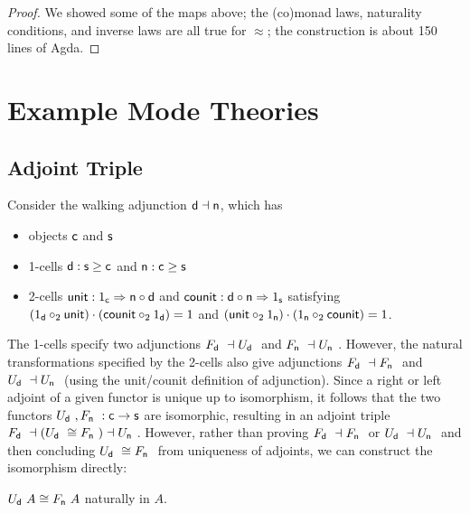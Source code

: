 \documentclass{drl-common/llncs}
\newcommand{\la}{\ensuremath{\dashv}}
\newcommand{\tc}[2]{\ensuremath{#1 \Rightarrow #2}}
\newcommand\compo[2]{\ensuremath{#1 \circ #2}}
\newcommand\compv[2]{\ensuremath{#1 \cdot #2}}
\newcommand\comph[2]{\ensuremath{#1 \mathbin{\circ_2} #2}}
\newcommand\F[2]{\ensuremath{F_{#1} \,\, #2}}
\newcommand\U[2]{\ensuremath{U_{#1} \,\, #2}}
\newcommand\ap[2]{\ensuremath{#1 \approx #2}}
\newcommand\iso{\cong}
\begin{document}
\begin{proof}
We showed some of the maps above; the (co)monad laws, naturality
conditions, and inverse laws are all true for \ap{}{}; the construction
is about 150 lines of Agda.
\end{proof}

\section{Example Mode Theories}
\label{sec:triple}

\subsection{Adjoint Triple}

Consider the walking adjunction $\dsd d \la \dsd n$, which has

\begin{itemize}
\item objects $\mathsf{c}$ and $\mathsf{s}$
\item 1-cells $\mathsf{d} : \mathsf{s} \ge \mathsf{c}$ and $\mathsf{n} : \mathsf{c} \ge
  \mathsf{s}$
\item 2-cells $\dsd{unit} : \tc {1_{\dsd c}} {\compo{\dsd{n}} {\dsd{d}}}$ 
and $\dsd{counit} : \tc {\compo{\dsd{d}} {\dsd{n}}} {1_{\dsd s}}$ satisfying \\
$\compv{(\comph{1_{\dsd{d}}}{\dsd{unit}})}{(\comph{\dsd{counit}}{1_{\dsd d}})} = 1$
and 
$\compv{(\comph{\dsd{unit}}{1_{\dsd{n}}})}{(\comph{1_{\dsd n}}{\dsd{counit}})} = 1$.
\end{itemize}
\noindent
The 1-cells specify two adjunctions $\F{\dsd d}{} \la \U{\dsd d}{}$ and
$\F{\dsd n}{} \la \U{\dsd n}{}$.  However, the natural transformations
specified by the 2-cells also give adjunctions $\F{\dsd d}{} \la \F{\dsd
  n}{}$ and $\U{\dsd d}{} \la \U{\dsd n}{}$ (using the unit/counit
definition of adjunction).  Since a right or left adjoint of a given
functor is unique up to isomorphism, it follows that the two functors
$\U{\dsd d}{},\F{\dsd n}{} : \dsd c \to \dsd s$ are isomorphic,
resulting in an adjoint triple $\F{\dsd d}{} \la (\U{\dsd d}{} \iso
\F{\dsd{n}}{}) \la \U{\dsd{n}}{}$.  However, rather than proving
$\F{\dsd d}{} \la \F{\dsd n}{}$ or $\U{\dsd d}{} \la \U{\dsd n}{}$ and
then concluding $\U{\dsd d}{} \iso \F{\dsd n}{}$ from uniqueness of
adjoints, we can construct the isomorphism directly:

\begin{lemma} \label{lem:mergeFU}
$\U{\dsd d}{A} \iso \F{\dsd n}{A}$ naturally in $A$.
\end{lemma}
\end{document}
